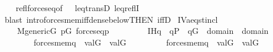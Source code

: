\begin{isabellebody}
%
\isadelimproof
\ \ %
\endisadelimproof
%
\isatagproof
{}\isamarkupfalse%
\ refl{\isacharunderscore}{\kern0pt}forces{\isacharunderscore}{\kern0pt}eq{\isacharbrackleft}{\kern0pt}of\ {\isacharunderscore}{\kern0pt}\ {\isasymsigma}{\isacharbrackright}{\kern0pt}\ leq{\isacharunderscore}{\kern0pt}transD\ leq{\isacharunderscore}{\kern0pt}reflI\ \isanewline
\ \ \isamarkupfalse%
\ {\isacharparenleft}{\kern0pt}blast\ intro{\isacharcolon}{\kern0pt}forces{\isacharunderscore}{\kern0pt}mem{\isacharunderscore}{\kern0pt}iff{\isacharunderscore}{\kern0pt}dense{\isacharunderscore}{\kern0pt}below{\isacharbrackleft}{\kern0pt}THEN\ iffD{}{\isacharbrackright}{\kern0pt}{\isacharparenright}{\kern0pt}%
\endisatagproof
{\isafoldproof}%
%
\isadelimproof
\isanewline
%
\endisadelimproof
\isanewline
\isanewline
{}\isamarkupfalse%
\ IV{}{}{}a{\isacharunderscore}{\kern0pt}eq{\isacharunderscore}{\kern0pt}{}st{\isacharunderscore}{\kern0pt}incl{\isacharcolon}{\kern0pt}\isanewline
\ \ \isanewline
\ \ \ \ {\isachardoublequoteopen}M{\isacharunderscore}{\kern0pt}generic{\isacharparenleft}{\kern0pt}G{\isacharparenright}{\kern0pt}{\isachardoublequoteclose}\ {\isachardoublequoteopen}p{\isasymin}G{\isachardoublequoteclose}\ {\isachardoublequoteopen}forces{\isacharunderscore}{\kern0pt}eq{\isacharparenleft}{\kern0pt}p{\isacharcomma}{\kern0pt}{\isasymtau}{\isacharcomma}{\kern0pt}{\isasymtheta}{\isacharparenright}{\kern0pt}{\isachardoublequoteclose}\isanewline
\ \ \ \ \isanewline
\ \ \ \ IH{\isacharcolon}{\kern0pt}{\isachardoublequoteopen}{\isasymAnd}q\ {\isasymsigma}{\isachardot}{\kern0pt}\ q{\isasymin}P\ {\isasymLongrightarrow}\ q{\isasymin}G\ {\isasymLongrightarrow}\ {\isasymsigma}{\isasymin}domain{\isacharparenleft}{\kern0pt}{\isasymtau}{\isacharparenright}{\kern0pt}\ {\isasymunion}\ domain{\isacharparenleft}{\kern0pt}{\isasymtheta}{\isacharparenright}{\kern0pt}\ {\isasymLongrightarrow}\ \isanewline
\ \ \ \ \ \ \ \ {\isacharparenleft}{\kern0pt}forces{\isacharunderscore}{\kern0pt}mem{\isacharparenleft}{\kern0pt}q{\isacharcomma}{\kern0pt}{\isasymsigma}{\isacharcomma}{\kern0pt}{\isasymtau}{\isacharparenright}{\kern0pt}\ {\isasymlongrightarrow}\ val{\isacharparenleft}{\kern0pt}G{\isacharcomma}{\kern0pt}{\isasymsigma}{\isacharparenright}{\kern0pt}\ {\isasymin}\ val{\isacharparenleft}{\kern0pt}G{\isacharcomma}{\kern0pt}{\isasymtau}{\isacharparenright}{\kern0pt}{\isacharparenright}{\kern0pt}\ {\isasymand}\isanewline
\ \ \ \ \ \ \ \ {\isacharparenleft}{\kern0pt}forces{\isacharunderscore}{\kern0pt}mem{\isacharparenleft}{\kern0pt}q{\isacharcomma}{\kern0pt}{\isasymsigma}{\isacharcomma}{\kern0pt}{\isasymtheta}{\isacharparenright}{\kern0pt}\ {\isasymlongrightarrow}\ val{\isacharparenleft}{\kern0pt}G{\isacharcomma}{\kern0pt}{\isasymsigma}{\isacharparenright}{\kern0pt}\ {\isasymin}\ val{\isacharparenleft}{\kern0pt}G{\isacharcomma}{\kern0pt}{\isasymtheta}{\isacharparenright}{\kern0pt}{\isacharparenright}{\kern0pt}{\isachardoublequoteclose}\isanewline

\end{isabellebody}
